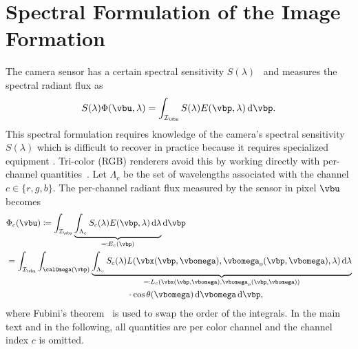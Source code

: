 \clearpage
\setcounter{page}{1}
\maketitlesupplementary
\setcounter{section}{0}
\setcounter{table}{0}
\setcounter{figure}{0}
\setcounter{equation}{0}
\renewcommand{\theHsection}{A.\arabic{section}}\renewcommand{\theHtable}{A\arabic{table}}%
\renewcommand{\theHfigure}{A\arabic{figure}}\renewcommand{\theHequation}{A\arabic{equation}}%


\section{Spectral Formulation of the Image Formation}
\label{sec:supp-image-formation}
The camera sensor has a certain spectral sensitivity $S(\lambda)$~\cite{akkaynak2017space,
akkaynak2018revised, Darrodi:15, pharr2023physically,
toivonen2020practical} and measures the spectral radiant flux as \cite{space-of-spectral-sensitivity-2013}
\begin{align*}
    S(\lambda)\Phi(\vbu,\lambda) = \int_{\mathcal{I}_{\vbu}}S(\lambda)E(\vbp,\lambda)\odif{\vbp}.
\end{align*}
This spectral formulation requires knowledge of the camera's spectral sensitivity
$S(\lambda)$ which is difficult to recover in practice because it
requires specialized equipment \cite{akkaynak2017space, Darrodi:15, toivonen2020practical}. Tri-color (RGB) renderers avoid this by working directly with per-channel quantities~\cite{Finlayson-PAMI-2017, rgb}.
Let $\Lambda_c$ be the set of wavelengths associated with the channel $c\in\{r,g,b\}$.
The per-channel radiant flux measured by the sensor in pixel $\vbu$ becomes
\begin{align*}
    &\Phi_c(\vbu) \coloneqq \int_{\mathcal{I}_{\vbu}}\underbrace{\int_{\Lambda_c}S_c(\lambda)E(\vbp,\lambda)\odif{\lambda}}_{\eqqcolon E_c(\vbp)}\odif{\vbp}\nonumber\\
    &=\int_{\mathcal{I}_{\vbu}}\int_{\calOmega(\vbp)}\underbrace{\int_{\Lambda_c}S_c(\lambda)L(\vbx(\vbp,\vbomega),\vbomega_o(\vbp,\vbomega),\lambda)\odif{\lambda}}_{\eqqcolon L_c(\vbx(\vbp,\vbomega),\vbomega_o(\vbp,\vbomega))}\nonumber\\
    &\qquad\qquad\qquad\qquad\qquad\qquad\qquad\cdot\cos\theta(\vbomega)\odif{\vbomega}\odif{\vbp}\nonumber,
\end{align*}
where Fubini's theorem~\cite{heuser2004} is used to swap the order of the integrals.
In the main text and in the following, all quantities are per color channel and the channel index $c$ is omitted.


